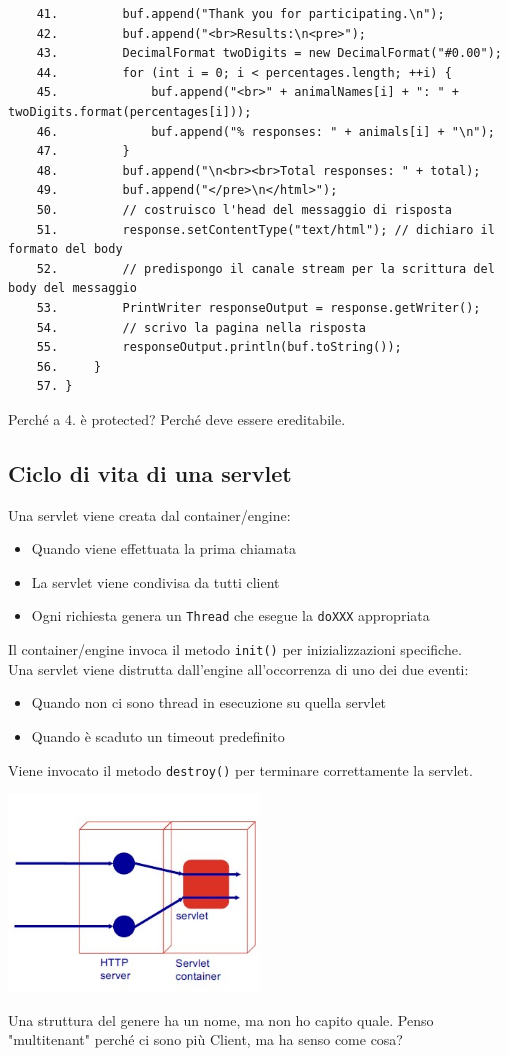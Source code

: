 \begin{verbatim}
    41.         buf.append("Thank you for participating.\n");
    42.         buf.append("<br>Results:\n<pre>");
    43.         DecimalFormat twoDigits = new DecimalFormat("#0.00");
    44.         for (int i = 0; i < percentages.length; ++i) {
    45.             buf.append("<br>" + animalNames[i] + ": " + twoDigits.format(percentages[i]));
    46.             buf.append("% responses: " + animals[i] + "\n");
    47.         }
    48.         buf.append("\n<br><br>Total responses: " + total);
    49.         buf.append("</pre>\n</html>");
    50.         // costruisco l'head del messaggio di risposta
    51.         response.setContentType("text/html"); // dichiaro il formato del body
    52.         // predispongo il canale stream per la scrittura del body del messaggio
    53.         PrintWriter responseOutput = response.getWriter();
    54.         // scrivo la pagina nella risposta
    55.         responseOutput.println(buf.toString());
    56.     }
    57. }
\end{verbatim}
Perché a 4. è protected? Perché deve essere ereditabile.

\subsection{Ciclo di vita di una servlet}
Una servlet viene creata dal container/engine:
\begin{itemize}
    \item Quando viene effettuata la prima chiamata
    \item La servlet viene condivisa da tutti client
    \item Ogni richiesta genera un \verb#Thread# che esegue la \verb#doXXX# appropriata
\end{itemize}
Il container/engine invoca il metodo \verb#init()# per inizializzazioni specifiche.
\\Una servlet viene distrutta dall'engine all'occorrenza di uno dei due eventi:
\begin{itemize}
    \item Quando non ci sono thread in esecuzione su quella servlet
    \item Quando è scaduto un timeout predefinito
\end{itemize}
Viene invocato il metodo \verb#destroy()# per terminare correttamente la servlet.
\begin{center}
    \includegraphics[width=0.5\textwidth]{img/appWeb9.jpg}
\end{center}
Una struttura del genere ha un nome, ma non ho capito quale. Penso "multitenant" perché ci sono più Client, ma ha senso come cosa?

